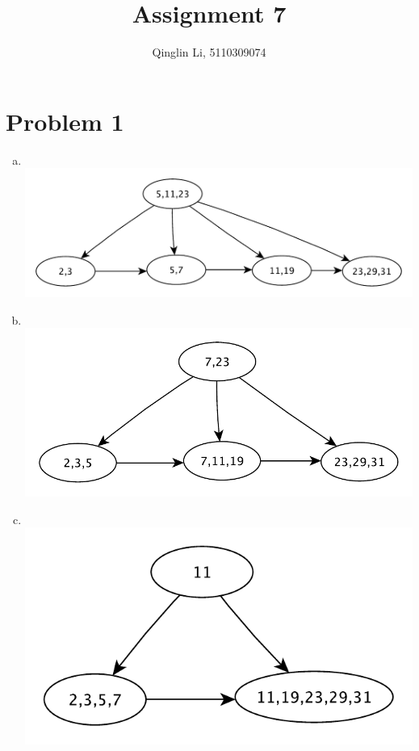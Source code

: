 \documentclass[a4paper,11pt]{article}
\begin{document}
\pagestyle{fancy}
\rfoot{\thepage}
\setlength{\parskip}{0.7ex plus0.2ex minus0.2ex}
\cfoot{\empty}
\lhead{\empty}


\title{Assignment 7}
\author{Qinglin Li, 5110309074}
\date{}
\maketitle

\headheight 3pt
\thispagestyle{fancy}
\section*{Problem 1}
\begin{enumerate}[a.]
\item ~\\ 
\includegraphics[scale=0.8]{1-1}
\item ~\\
\includegraphics[scale=0.8]{1-2}
\item ~\\
\includegraphics[scale=0.8]{1-3}
\end{enumerate}
\newpage
\end{document}

